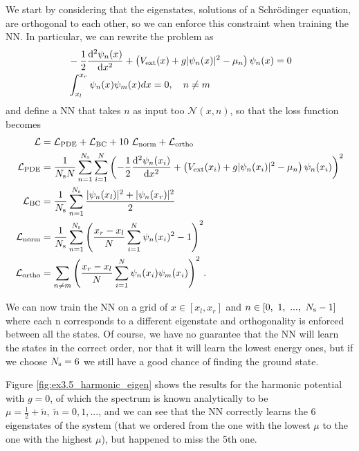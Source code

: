 \documentclass[a4paper, titlepage]{article}
\begin{document}
We start by considering that the eigenstates, solutions of a Schr\"{o}dinger
equation, are orthogonal to each other, so we can enforce this constraint when
training the NN.
In particular, we can rewrite the problem as
\begin{align}
    &-\frac{1}{2} \dv[2]{\psi_n(x)}{x} 
    + \left(V_{\rm ext}(x) + g |\psi_n(x)|^2 - \mu_n\right) \psi_n(x) = 0 \\
    &\int_{x_l}^{x_r} \psi_n(x) \psi_m(x) dx = 0, \quad n \neq m
\end{align}
and define a NN that takes $n$ as input too $\mathcal N(x, n)$, so that the
loss function becomes
\begin{align}
    \mathcal L &= \mathcal L_{\rm PDE} + \mathcal L_{\rm BC} 
        + 10 ~ \mathcal L_{\rm norm} + \mathcal L_{\rm ortho} \\
    \mathcal L_{\rm PDE} &= \frac{1}{N_{\rm s}N} \sum_{n=1}^{N_{\rm s}} \sum_{i=1}^N
        \left( -\frac{1}{2} \dv[2]{\psi_n(x_i)}{x} + \left(V_{\rm ext}(x_i)
        + g |\psi_n(x_i)|^2 - \mu_n\right) \psi_n(x_i) \right)^2 \\
    \mathcal L_{\rm BC} &= \frac{1}{N_{\rm s}} \sum_{n=1}^{N_{\rm s}}
    \frac{|\psi_n(x_l)|^2 + |\psi_n(x_r)|^2}{2} \\
    \mathcal L_{\rm norm} &= \frac{1}{N_{\rm s}} \sum_{n=1}^{N_{\rm s}}
        \left( \frac{x_r - x_l}{N} \sum_{i = 1}^N \psi_n(x_i)^2  - 1 \right)^2 \\
    \mathcal L_{\rm ortho} &= \sum_{n \neq m} \left(\frac{x_r-x_l}{N}
        \sum_{i=1}^N \psi_n(x_i) \psi_m(x_i) \right)^2 \, .
\end{align}

We can now train the NN on a grid of $x \in [x_l, x_r]$ and 
$n \in [0, ~ 1, ~ ..., ~ N_{\rm s} - 1]$ where each n corresponds to a different
eigenstate and orthogonality is enforced between all the states.
Of course, we have no guarantee that the NN will learn the states in the correct 
order, nor that it will learn the lowest energy ones, but if we choose
$N_{\rm s} = 6$ we still have a good chance of finding the ground state.

Figure \ref{fig:ex3.5_harmonic_eigen} shows the results for the harmonic
potential with $g = 0$, of which the spectrum is known analytically to be
$\mu = \frac{1}{2} + \tilde n, ~ \tilde n = 0, 1, ...$, and we can
see that the NN correctly learns the 6 eigenstates of the system (that we 
ordered from the one with the lowest $\mu$ to the one with the highest $\mu$),
but happened to miss the 5th one.
\end{document}
